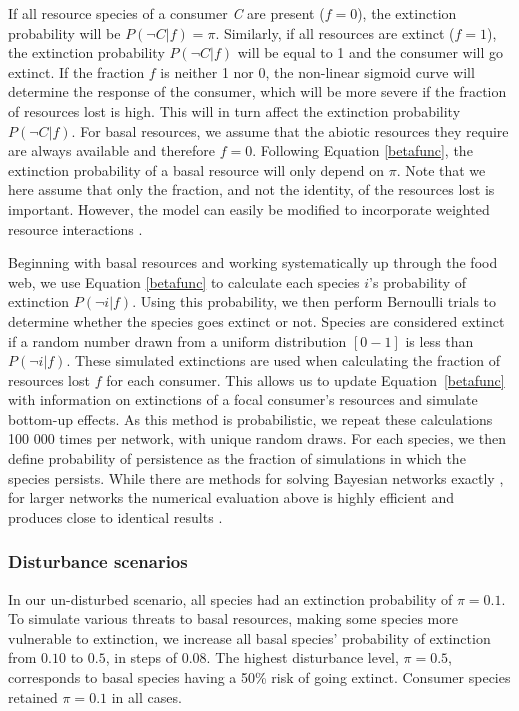 \documentclass[12pt]{article}
\begin{document}
\begin{spacing}{2.0}
		If all resource species of a consumer \textit{C} are present ($f = 0$), the extinction probability will be $P(\lnot C|f) = \pi$. 
		Similarly, if all resources are extinct ($f = 1$), the extinction probability $P(\lnot C|f)$ will be equal to 1 and the consumer will go extinct.
		If the fraction $f$ is neither 1 nor 0, the non-linear sigmoid curve will determine the response of the consumer, which will be more severe if the fraction of resources lost is high. This will in turn affect the extinction probability $P(\lnot C|f)$.
		For basal resources, we assume that the abiotic resources they require are always available and therefore $f=0$. 
		Following Equation \ref{betafunc}, the extinction probability of a basal resource will only depend on $\pi$.
		Note that we here assume that only the fraction, and not the identity, of the resources lost is important. 
		However, the model can easily be modified to incorporate weighted resource interactions \citep[see][]{Eklof2013}.
		
		
        Beginning with basal resources and working systematically up through the food web, we use Equation \ref{betafunc} to calculate each species $i$'s probability of extinction $P(\lnot i|f)$.
        Using this probability, we then perform Bernoulli trials to determine whether the species goes extinct or not. 
        Species are considered extinct if a random number drawn from a uniform distribution $[0-1]$ is less than $P(\lnot i|f)$.
        These simulated extinctions are used when calculating the fraction of resources lost $f$ for each consumer.
        This allows us to update Equation~\ref{betafunc} with information on extinctions of a focal consumer's resources and simulate bottom-up effects. As this method is probabilistic, we repeat these calculations 100 000 times per network, with unique random draws.
        For each species, we then define probability of persistence as the fraction of simulations in which the species persists. 
        While there are methods for solving Bayesian networks exactly \citep{Eklof2013}, for larger networks the numerical evaluation above is highly efficient and produces close to identical results \citep{Haussler2020}.
		
	
		
        \subsubsection*{Disturbance scenarios}
        
            In our un-disturbed scenario, all species had an extinction probability of $\pi = 0.1$. 
            To simulate various threats to basal resources, making some species more vulnerable to extinction, we increase all basal species' probability of extinction from $0.10$ to $0.5$, in steps of $0.08$. 
            The highest disturbance level, $\pi = 0.5$, corresponds to basal species having a 50\% risk of going extinct. 
            Consumer species retained $\pi=0.1$ in all cases.



\end{spacing}
\end{document}
